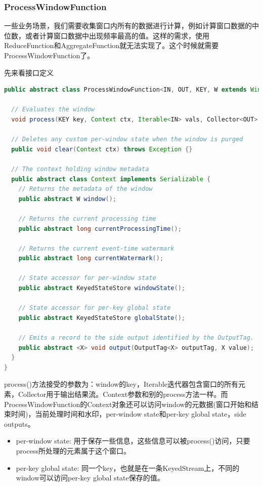 \documentclass[oneside]{ctexbook}
\begin{document}
\subsubsection{ProcessWindowFunction}

一些业务场景，我们需要收集窗口内所有的数据进行计算，例如计算窗口数据的中位数，或者计算窗口数据中出现频率最高的值。这样的需求，使用ReduceFunction和AggregateFunction就无法实现了。这个时候就需要ProcessWindowFunction了。

先来看接口定义

\begin{lstlisting}[language=java]
public abstract class ProcessWindowFunction<IN, OUT, KEY, W extends Window> extends AbstractRichFunction {
  
  // Evaluates the window
  void process(KEY key, Context ctx, Iterable<IN> vals, Collector<OUT> out) throws Exception;

  // Deletes any custom per-window state when the window is purged
  public void clear(Context ctx) throws Exception {}

  // The context holding window metadata
  public abstract class Context implements Serializable {
    // Returns the metadata of the window
    public abstract W window();

    // Returns the current processing time
    public abstract long currentProcessingTime();

    // Returns the current event-time watermark
    public abstract long currentWatermark();

    // State accessor for per-window state
    public abstract KeyedStateStore windowState();

    // State accessor for per-key global state
    public abstract KeyedStateStore globalState();

    // Emits a record to the side output identified by the OutputTag.
    public abstract <X> void output(OutputTag<X> outputTag, X value);
  }
}
\end{lstlisting}

process()方法接受的参数为：window的key，Iterable迭代器包含窗口的所有元素，Collector用于输出结果流。Context参数和别的process方法一样。而ProcessWindowFunction的Context对象还可以访问window的元数据(窗口开始和结束时间)，当前处理时间和水印，per-window state和per-key global state，side outputs。

\begin{itemize}
\item per-window state: 用于保存一些信息，这些信息可以被process()访问，只要process所处理的元素属于这个窗口。
\item per-key global state: 同一个key，也就是在一条KeyedStream上，不同的window可以访问per-key global state保存的值。
\end{itemize}
\end{document}
